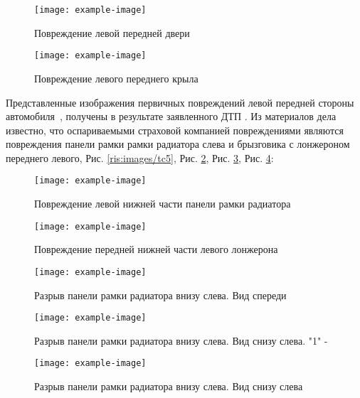 \begin{figure}[!h]\centering
	\parbox[t]{0.49\textwidth}
	{\centering
		\texttt{[image: example-image]}
		\caption{\footnotesize {Повреждение левой передней двери }}
		\label{ris:images/tc8}}
	\hfil \hfil
	\parbox[t]{0.49\textwidth}
	{\centering
		\texttt{[image: example-image]}
		\caption{\footnotesize {Повреждение левого переднего крыла}}
		\label{ris:images/tc9}}
	
\end{figure}

Представленные  изображения первичных повреждений левой передней стороны автомобиля \,,  получены в результате заявленного ДТП .  Из материалов дела известно, что оспариваемыми  страховой компанией повреждениями являются повреждения    панели рамки рамки радиатора слева и  брызговика с лонжероном переднего левого, Рис. \ref{ris:images/tc5}, Рис. \ref{ris:images/tc4}, Рис. \ref{ris:images/tc6}, Рис. \ref{ris:images/tc7}:


  \begin{figure}[h]\centering
  	\parbox[t]{0.49\textwidth}
  	{\centering
  		\texttt{[image: example-image]}
  		\caption{\footnotesize {Повреждение левой нижней части панели рамки радиатора  }}
  		\label{ris:images/tc5}}
  	\hfil \hfil
  	\parbox[t]{0.49\textwidth}
  	{\centering
  		\texttt{[image: example-image]}
  		\caption{\footnotesize {Повреждение передней нижней части левого лонжерона}}
  		\label{ris:images/tc4}}
  \end{figure}

\begin{figure}[h]
	\centering
	\texttt{[image: example-image]}
	\caption{{\footnotesize {Разрыв панели рамки радиатора внизу слева. Вид спереди}}}
	\label{ris:images/tc6}
\end{figure}
\pagebreak

\begin{figure}[!h]
	\centering
	\texttt{[image: example-image]}
	\caption{{\footnotesize {Разрыв панели рамки радиатора внизу слева. Вид снизу слева. "1" - }}}
	\label{ris:images/tc7}
\end{figure}

\begin{figure}[!h]
	\centering
	\texttt{[image: example-image]}
	\caption{{\footnotesize {Разрыв панели рамки радиатора внизу слева. Вид снизу слева}}}
	\label{ris:images/tc11}
\end{figure}

